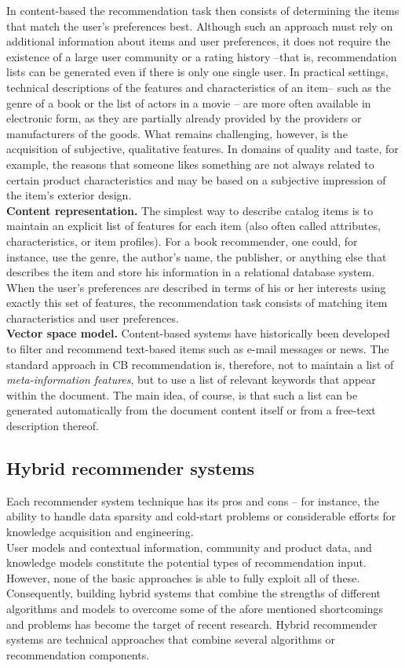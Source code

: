 In content-based the recommendation task then consists of determining the
items that match the user’s preferences best. Although such an approach must
rely on additional information about items and user preferences, it does not
require the existence of a large user community or a rating history –that is,
recommendation lists can be generated even if there is only one single user. In
practical settings, technical descriptions of the features and characteristics
of an item– such as the genre of a book or the list of actors in a movie – are
more often available in electronic form, as they are partially already provided
by the providers or manufacturers of the goods. What remains challenging,
however, is the acquisition of subjective, qualitative features. In domains of
quality and taste, for example, the reasons that someone likes something are not
always related to certain product characteristics and may be based on a
subjective impression of the item’s exterior design.   \\
\textbf{Content representation.} The simplest way to describe catalog items is
to maintain an explicit list of features for each item (also often called
attributes, characteristics, or item profiles). For a book recommender, one
could, for instance, use the genre, the author’s name, the publisher, or
anything else that describes the item and store his information in a relational
database system. When the user’s preferences are described in terms of his or
her interests using exactly this set of features, the recommendation task
consists of matching item characteristics and user preferences.  \\
\textbf{Vector space model.}  Content-based systems have historically been
developed to filter and recommend text-based items such as e-mail messages or
news. The standard approach in CB recommendation is, therefore, not to maintain
a list of \textit{meta-information features}, but to use a list of relevant keywords
that appear within the document. The main idea, of course, is that such a list
can be generated automatically from the document content itself or from a 
free-text description thereof.

\subsection{Hybrid recommender systems} 

Each recommender system technique has its pros and cons – for
instance, the ability to handle data sparsity and cold-start problems
or considerable efforts for knowledge acquisition and engineering. \\ 
User models and contextual information, community and
product data, and knowledge models constitute the potential types of
recommendation input. However, none of the basic approaches is able to
fully exploit all of these. Consequently, building hybrid systems that
combine the strengths of different algorithms and models to overcome
some of the afore mentioned shortcomings and problems has become the
target of recent research. Hybrid recommender systems are technical
approaches that combine several algorithms or recommendation components.

